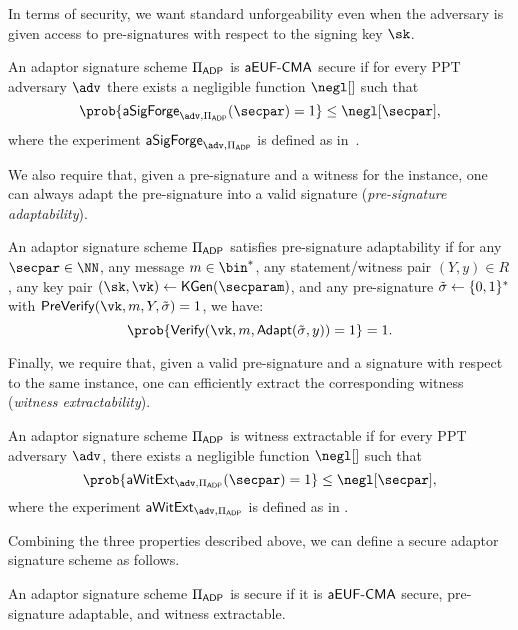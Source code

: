 In terms of security, we want standard unforgeability even when the adversary is given access to pre-signatures with respect to the signing key $\sk$.

\begin{definition}[Unforgeability]
\label{def:aeufcma}
	An adaptor signature scheme $\Pi_{\mathsf{ADP}}$ is $\mathsf{aEUF}\text{-}\mathsf{CMA}$ secure if for every PPT adversary $\adv$ there exists a negligible function $\negl[]$ such that
	$$\prob{\ASigForge_{\adv, \Pi_\ADP}(\secpar) = 1} \leq \negl[\secpar],$$
	where the experiment $\ASigForge_{\adv,\Pi_\ADP}$ is defined as in~.
    
\end{definition}

We also require that, given a pre-signature and a witness for the instance, one can always adapt the pre-signature into a valid signature (\emph{pre-signature adaptability}). 
 
\begin{definition}
\label{def:as-adaptability}
	An adaptor signature scheme $\Pi_{\mathsf{ADP}}$ satisfies pre-signature adaptability 
	if for any $\secpar \in \NN$, any message $m \in \bin^*$, any statement/witness pair $(Y, 
	y) \in R$, any key pair $(\sk,\vk) \gets \kgen(\secparam)$, and any pre-signature 
	$\tilde{\sigma} \gets \{0,1\}^*$ with $\prevrfy(\vk, m, Y, \presig) = 1$, we have: 
	\[\prob{\vrfy(\vk,m, \adapt(\presig,y)) = 1} = 1. \]
\end{definition}

Finally, we require that, given a valid pre-signature and a signature with respect to the same instance, one can efficiently extract the corresponding witness (\emph{witness extractability}). 

\begin{definition}
\label{def:as-extractability}
	An adaptor signature scheme $\Pi_{\mathsf{ADP}}$ is witness extractable if 
	for every PPT adversary $\adv$, there exists a negligible function $\negl[]$ such that 
	\[\prob{\AExtractability_{\adv, \Pi_\ADP}(\secpar) = 1} 
	\leq \negl[\secpar],\] where the experiment $\AExtractability_{\adv, 
	\Pi_\ADP}$ is defined as in .
    
\end{definition}

Combining the three properties described above, we can define a secure adaptor signature scheme 
as follows.

\begin{definition}
	An adaptor signature scheme $\Pi_{\mathsf{ADP}}$ is secure if it is $\mathsf{aEUF}\text{-}\mathsf{CMA}$ 
	secure, pre-signature adaptable, and witness extractable.
\end{definition}


